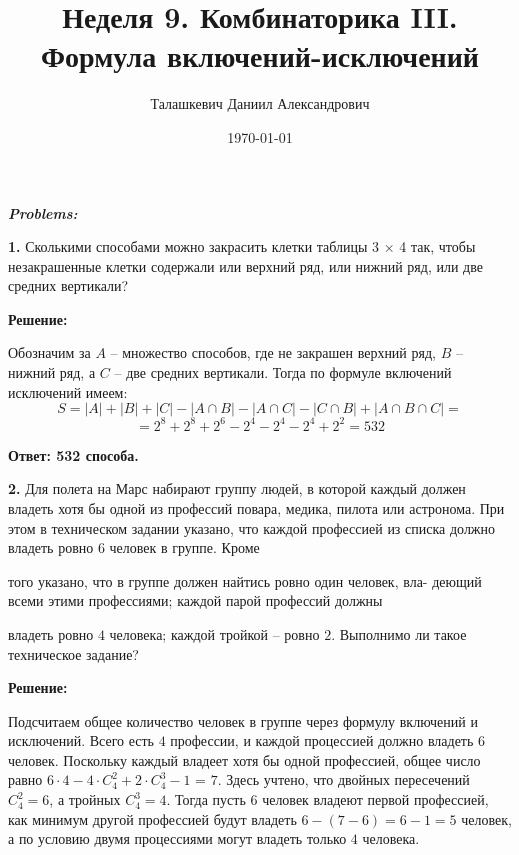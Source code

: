 \documentclass[a4paper,12pt]{article} %
\author{Талашкевич Даниил Александрович}
\title{Неделя 9. Комбинаторика III. 
Формула включений-исключений}
\date{\today}
\begin{document}
\maketitle
\thispagestyle{empty}

\newpage
\setcounter{page}{1}
\begin{center}
\itshape
\bfseries
{ \Large Problems:}
\end{center}

{\bf 1.} Сколькими способами можно закрасить клетки таблицы 3 × 4 так,
чтобы незакрашенные клетки содержали или верхний ряд, или нижний
ряд, или две средних вертикали?
\begin{center}
\bfseries
{\Large Решение: }
\end{center}

Обозначим за $A$ -- множество способов, где не закрашен верхний ряд, $B$ -- нижний ряд, а $C$ -- две средних вертикали. Тогда по формуле включений исключений имеем:
\[S = |A| + |B| + |C| - |A \cap B| - |A \cap C| - |C \cap B| + |A \cap B \cap C| = \]
\[= 2^8 + 2^8 + 2^6 - 2^4 - 2^4 - 2^4 + 2^2 = 532\]


\begin{flushright}
\begin{large}
\textbf {Ответ:  532 способа.}
\end{large}
\end{flushright}

{\bf 2.} Для полета на Марс набирают группу людей, в которой каждый
должен владеть хотя бы одной из профессий повара, медика, пилота
или астронома. При этом в техническом задании указано, что каждой
профессией из списка должно владеть ровно $6$ человек в группе. Кроме

того указано, что в группе должен найтись ровно один человек, вла-
деющий всеми этими профессиями; каждой парой профессий должны

владеть ровно $4$ человека; каждой тройкой -- ровно $2$.
Выполнимо ли такое техническое задание?
\begin{center}
\bfseries
{\Large Решение: }
\end{center}

Подсчитаем общее количество человек в группе через формулу включений и исключений. Всего есть $4$ профессии, и каждой процессией должно владеть $6$ человек. Поскольку каждый владеет хотя бы одной профессией, общее число равно $6\cdot 4 - 4\cdot C_4^2 + 2\cdot C_4^3 - 1$ = $7$. Здесь учтено, что двойных пересечений $C_4^2 = 6$, а тройных $C_4^3 = 4$. Тогда пусть $6$ человек владеют первой профессией, как минимум другой профессией будут владеть $6 - (7 - 6) = 6 - 1 = 5$ человек, а по условию двумя процессиями могут владеть только $4$ человека.
\end{document}
